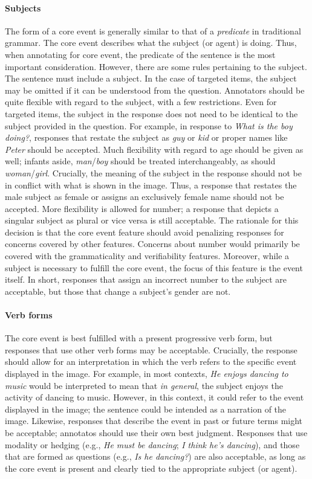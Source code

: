 \documentclass[12pt]{article}
\begin{document}
\paragraph{Subjects} \label{para:core-event-subjects} The form of a core event is generally similar to that of a \textit{predicate} in traditional grammar. The core event describes what the subject (or agent) is doing. Thus, when annotating for core event, the predicate of the sentence is the most important consideration. However, there are some rules pertaining to the subject. The sentence must include a subject. In the case of targeted items, the subject may be omitted if it can be understood from the question. Annotators should be quite flexible with regard to the subject, with a few restrictions. Even for targeted items, the subject in the response does not need to be identical to the subject provided in the question. For example, in response to \textit{What is the boy doing?}, responses that restate the subject as \textit{guy} or \textit{kid} or proper names like \textit{Peter} should be accepted. Much flexibility with regard to age should be given as well; infants aside, \textit{man}/\textit{boy} should be treated interchangeably, as should \textit{woman}/\textit{girl}. Crucially, the meaning of the subject in the response should not be in conflict with what is shown in the image. Thus, a response that restates the male subject as female or assigns an exclusively female name should not be accepted. More flexibility is allowed for number; a response that depicts a singular subject as plural or vice versa is still acceptable. The rationale for this decision is that the core event feature should avoid penalizing responses for concerns covered by other features. Concerns about number would primarily be covered with the grammaticality and verifiability features. Moreover, while a subject is necessary to fulfill the core event, the focus of this feature is the event itself. In short, responses that assign an incorrect number to the subject  are acceptable, but those that change a subject's gender are not.

\paragraph{Verb forms}
The core event is best fulfilled with a present progressive verb form, but responses that use other verb forms may be acceptable. Crucially, the response should allow for an interpretation in which the verb refers to the specific event displayed in the image. For example, in most contexts, \textit{He enjoys dancing to music} would be interpreted to mean that \textit{in general}, the subject enjoys the activity of dancing to music. However, in this context, it could refer to the event displayed in the image; the sentence could be intended as a narration of the image. Likewise, responses that describe the event in past or future terms might be acceptable; annotatos should use their own best judgment. Responses that use modality or hedging (e.g., \textit{He must be dancing}; \textit{I think he's dancing}), and those that are formed as questions (e.g., \textit{Is he dancing?}) are also acceptable, as long as the core event is present and clearly tied to the appropriate subject (or agent).
\end{document}
